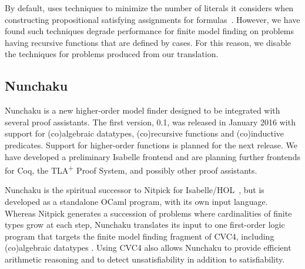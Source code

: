 By default, \cvc uses techniques to minimize the number of literals it
considers when constructing propositional satisfying assignments for
formulas~\cite{relevancy2007}. However, we have found such techniques degrade
performance for finite model finding on problems having recursive functions
that are defined by cases. For this reason, we disable the techniques for
problems produced from our translation.



\subsection{Nunchaku}
\label{ssec:nunchaku}

Nunchaku is a new higher-order model finder designed to be integrated with
several proof assistants. The first version, 0.1, was released in January 2016
with support for (co)algebraic datatypes, (co)recursive functions and
(co)inductive predicates. Support for higher-order functions is planned for
the next release. We have developed a preliminary Isabelle frontend and are
planning further frontends for Coq, the TLA\textsuperscript{+} Proof System,
and possibly other proof assistants.

Nunchaku is the spiritual successor to Nitpick for
Isabelle/HOL~\cite{blanchette-nipkow-2010}, but is developed as a standalone
OCaml program, with its own input language. Whereas Nitpick generates a
succession of problems where cardinalities of finite types grow at each step,
Nunchaku translates its input to one first-order logic program that targets
the finite model finding fragment of CVC4, including
(co)algebraic datatypes \cite{reynolds-blanchette-2015-codata}.
Using CVC4 also allows Nunchaku to provide efficient arithmetic
reasoning and to detect unsatisfiability in addition to satisfiability.

